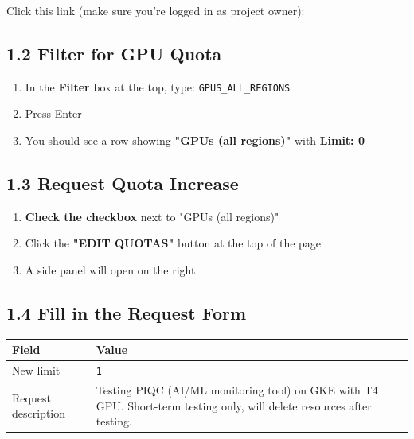 \documentclass[11pt,a4paper]{article}
\begin{document}
Click this link (make sure you're logged in as project owner):

\begin{center}
\end{center}

\subsection{1.2 Filter for GPU Quota}

\begin{enumerate}
    \item In the \textbf{Filter} box at the top, type: \texttt{GPUS\_ALL\_REGIONS}
    \item Press Enter
    \item You should see a row showing \textbf{"GPUs (all regions)"} with \textbf{Limit: 0}
\end{enumerate}

\subsection{1.3 Request Quota Increase}

\begin{enumerate}
    \item \textbf{Check the checkbox} next to "GPUs (all regions)"
    \item Click the \textbf{"EDIT QUOTAS"} button at the top of the page
    \item A side panel will open on the right
\end{enumerate}

\subsection{1.4 Fill in the Request Form}

\begin{table}[h]
\centering
\begin{tabular}{@{}lp{10cm}@{}}
\toprule
\textbf{Field} & \textbf{Value} \\
\midrule
New limit & \texttt{1} \\
Request description & Testing PIQC (AI/ML monitoring tool) on GKE with T4 GPU. Short-term testing only, will delete resources after testing. \\
\bottomrule
\end{tabular}
\end{table}
\end{document}
